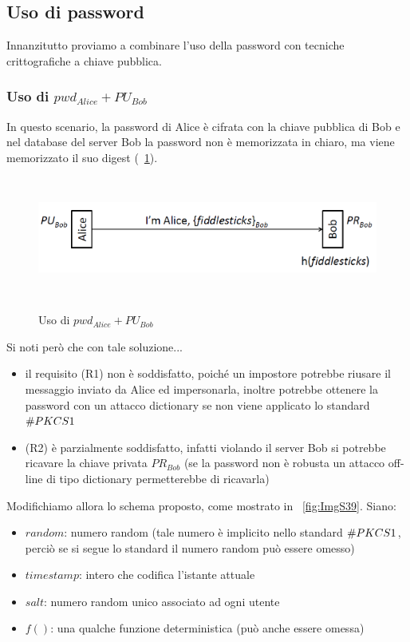 \subsection{Uso di password}
Innanzitutto proviamo a combinare l'uso della password con tecniche crittografiche a chiave pubblica.
\subsubsection{Uso di $pwd_{Alice} + PU_{Bob}$}
In questo scenario, la password di Alice è cifrata con la chiave pubblica di Bob e nel database del server Bob la password non è memorizzata in chiaro, ma viene memorizzato il suo digest (\figurename~\ref{fig:ImgS37}).
\begin{figure}[htbp]
	\centering%
	\subfigure%
	{\includegraphics[height=4cm, width=12cm, keepaspectratio]{Immagini/autenticazione/ImgS37.png}}
	\caption{Uso di $pwd_{Alice} + PU_{Bob}$\label{fig:ImgS37}} 	
\end{figure}
Si noti però che con tale soluzione...
\begin{itemize}
	\item il requisito (R1) non è soddisfatto, poiché un impostore potrebbe riusare il messaggio inviato da Alice ed
	impersonarla, inoltre potrebbe ottenere la password con un attacco dictionary se non viene applicato lo standard $\symbol{35}PKCS1$
	\item (R2) è parzialmente soddisfatto, infatti violando il server Bob si potrebbe ricavare la chiave privata $PR_{Bob}$ (se la password non è robusta un attacco off-line di tipo dictionary permetterebbe di ricavarla)
\end{itemize}
Modifichiamo allora lo schema proposto, come mostrato in \figurename~\ref{fig:ImgS39}. Siano:
\begin{itemize}
	\item $random$: numero random (tale numero è implicito nello standard $\symbol{35}PKCS1$, perciò se si segue lo standard il numero random può essere omesso)
	\item $timestamp$: intero che codifica l'istante attuale
	\item $salt$: numero random unico associato ad ogni utente
	\item $f()$: una qualche funzione deterministica (può anche essere omessa)
\end{itemize} 
